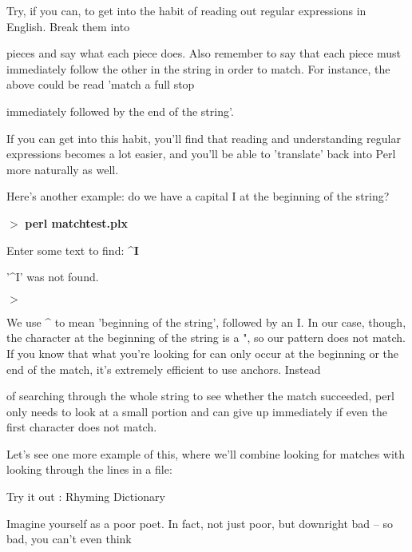 \documentclass[a4paper,11pt]{book}
\begin{document}
\noindent 

\noindent Try, if you can, to get into the habit of reading out regular expressions in English. Break them into

\noindent pieces and say what each piece does. Also remember to say that each piece must immediately follow the other in the string in order to match. For instance, the above could be read 'match a full stop

\noindent immediately followed by the end of the string'.

\noindent 

\noindent If you can get into this habit, you'll find that reading and understanding regular expressions becomes a lot easier, and you'll be able to 'translate' back into Perl more naturally as well.

\noindent 

\noindent Here's another example: do we have a capital I at the beginning of the string?

\noindent 

\noindent $>$ \textbf{perl matchtest.plx}

\noindent Enter some text to find: \textbf{\^{}I}

\noindent '\^{}I' was not found.

\noindent $>$

\noindent 

\noindent We use \^{} to mean 'beginning of the string', followed by an I. In our case, though, the character at the beginning of the string is a ", so our pattern does not match. If you know that what you're looking for can only occur at the beginning or the end of the match, it's extremely efficient to use anchors. Instead

\noindent of searching through the whole string to see whether the match succeeded, perl only needs to look at a small portion and can give up immediately if even the first character does not match.

\noindent 

\noindent Let's see one more example of this, where we'll combine looking for matches with looking through the lines in a file:

\noindent 

\noindent Try it out : Rhyming Dictionary

\noindent 

\noindent 

\noindent Imagine yourself as a poor poet. In fact, not just poor, but downright bad -- so bad, you can't even think
\end{document}
